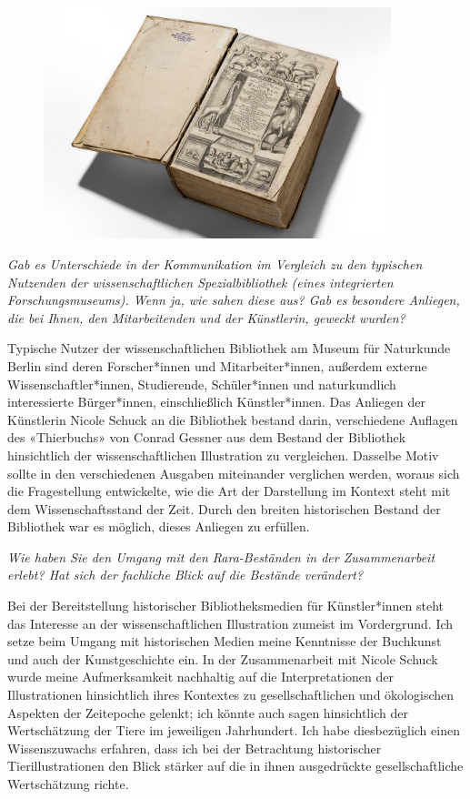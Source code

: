 \documentclass[a4paper,
fontsize=11pt,
oneside,
numbers=noperiodatend,
parskip=half-,
bibliography=totoc,
final
]{scrartcl}
\begin{document}
\begin{figure}
\centering
\includegraphics[width=0.9\textwidth]{img/image2.jpg}
\end{figure}

\emph{Gab es Unterschiede in der Kommunikation im Vergleich zu den
typischen Nutzenden der wissenschaftlichen Spezialbibliothek (eines
integrierten Forschungsmuseums). Wenn ja, wie sahen diese aus? Gab es
besondere Anliegen, die bei Ihnen, den Mitarbeitenden und der
Künstlerin, geweckt wurden?}

Typische Nutzer der wissenschaftlichen Bibliothek am Museum für
Naturkunde Berlin sind deren Forscher*innen und Mitarbeiter*innen,
außerdem externe Wissenschaftler*innen, Studierende, Schüler*innen und
naturkundlich interessierte Bürger*innen, einschließlich Künstler*innen.
Das Anliegen der Künstlerin Nicole Schuck an die Bibliothek bestand
darin, verschiedene Auflagen des «Thierbuchs» von Conrad Gessner aus dem
Bestand der Bibliothek hinsichtlich der wissenschaftlichen Illustration
zu vergleichen. Dasselbe Motiv sollte in den verschiedenen Ausgaben
miteinander verglichen werden, woraus sich die Fragestellung
entwickelte, wie die Art der Darstellung im Kontext steht mit dem
Wissenschaftsstand der Zeit. Durch den breiten historischen Bestand der
Bibliothek war es möglich, dieses Anliegen zu erfüllen.

\emph{Wie haben Sie den Umgang mit den Rara-Beständen in der
Zusammenarbeit erlebt? Hat sich der fachliche Blick auf die Bestände
verändert?}

Bei der Bereitstellung historischer Bibliotheksmedien für Künstler*innen
steht das Interesse an der wissenschaftlichen Illustration zumeist im
Vordergrund. Ich setze beim Umgang mit historischen Medien meine
Kenntnisse der Buchkunst und auch der Kunstgeschichte ein. In der
Zusammenarbeit mit Nicole Schuck wurde meine Aufmerksamkeit nachhaltig
auf die Interpretationen der Illustrationen hinsichtlich ihres Kontextes
zu gesellschaftlichen und ökologischen Aspekten der Zeitepoche gelenkt;
ich könnte auch sagen hinsichtlich der Wertschätzung der Tiere im
jeweiligen Jahrhundert. Ich habe diesbezüglich einen Wissenszuwachs
erfahren, dass ich bei der Betrachtung historischer Tierillustrationen
den Blick stärker auf die in ihnen ausgedrückte gesellschaftliche
Wertschätzung richte.
\end{document}
